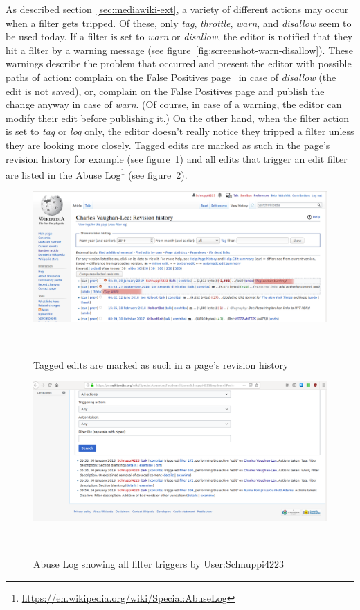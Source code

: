 As described section~\ref{sec:mediawiki-ext}, a variety of different actions may occur when a filter gets tripped.
Of these, only \emph{tag}, \emph{throttle}, \emph{warn}, and \emph{disallow} seem to be used today.
If a filter is set to \emph{warn} or \emph{disallow}, the editor is notified that they hit a filter by a warning message (see figure~\ref{fig:screenshot-warn-disallow}).
These warnings describe the problem that occurred and present the editor with possible paths of action:
complain on the False Positives page~\cite{Wikipedia:EditFilterFalsePositives} in case of \emph{disallow} (the edit is not saved),
or, complain on the False Positives page and publish the change anyway in case of \emph{warn}.
(Of course, in case of a warning, the editor can modify their edit before publishing it.)
On the other hand, when the filter action is set to \emph{tag} or \emph{log} only, the editor doesn't really notice they tripped a filter unless they are looking more closely.
Tagged edits are marked as such in the page's revision history for example (see figure~\ref{fig:tags-in-history})
and all edits that trigger an edit filter are listed in the Abuse Log\footnote{\url{https://en.wikipedia.org/wiki/Special:AbuseLog}} (see figure~\ref{fig:screenshot-abuse-log}).

\begin{figure}
\centering
  \includegraphics[width=0.9\columnwidth]{pics/screenshots-filter-trigger/Screenshot-tags-in-revision-history.png}
  \caption{Tagged edits are marked as such in a page's revision history}~\label{fig:tags-in-history}
\end{figure}

\begin{figure}
\centering
  \includegraphics[width=0.9\columnwidth]{pics/screenshots-filter-trigger/Screenshot-abuse-log.png}
  \caption{Abuse Log showing all filter triggers by User:Schnuppi4223}~\label{fig:screenshot-abuse-log}
\end{figure}

